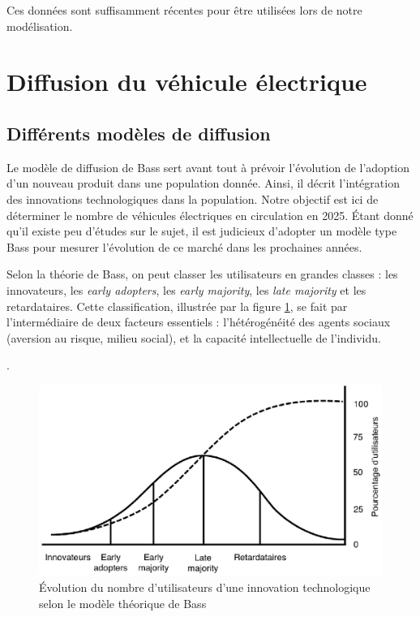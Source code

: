 \documentclass[10pt]{article}
\begin{document}
		Ces données sont suffisamment récentes pour être utilisées lors de notre modélisation.
		

\section{Diffusion du v\'ehicule \'electrique}

	\subsection{Différents modèles de diffusion}
	
		Le modèle de diffusion de Bass sert avant tout à prévoir l'évolution de l’adoption d’un nouveau produit dans une population donnée. Ainsi, il décrit l’intégration des innovations technologiques dans la population. Notre objectif est ici de déterminer le nombre de véhicules électriques en circulation en 2025. Étant donné qu'il existe peu d'études sur le sujet, il est judicieux d’adopter un modèle type Bass pour mesurer l'évolution de ce marché dans les prochaines années.
		
		
		Selon la théorie de Bass, on peut classer les utilisateurs en grandes classes : les innovateurs, les \textit{early adopters}, les \textit{early majority}, les \textit{late majority} et les retardataires. Cette classification, illustrée par la figure \ref{fig.BassUtilisateurs}, se fait par l’intermédiaire de deux facteurs essentiels : l’hétérogénéité des agents sociaux (aversion au risque, milieu social), et la capacité intellectuelle de l’individu.
		
	.
		\begin{figure}[h!]
			\caption{Évolution du nombre d'utilisateurs d'une innovation technologique selon le modèle théorique de Bass \label{fig.BassUtilisateurs}}
			\centering
			\includegraphics{fig/BassUtilisateurs.eps}
		\end{figure}
		
\end{document}
